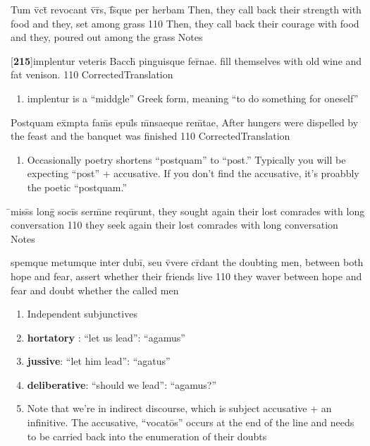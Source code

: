 \latline
  {Tum v\={\macron {\i}}ct\={} revocant v\={\macron {\i}}r\={\macron {\i}}s, f\={}s\={\macron {\i}}que per herbam}
  { Then, they call back their strength with food and they, set among grass }
  {110}
  { Then, they call back their courage with food and they, poured out among the grass }
  { Notes }


\latline
  {[\textbf{215}]implentur veteris Bacch\={\macron {\i}} pinguisque fer\={\macron {\i}}nae.}
  { fill themselves with old wine and fat venison. }
  {110}
  { CorrectedTranslation }
  { \begin{enumerate}
  	\item implentur is a ``middgle'' Greek form, meaning ``to do something for oneself''
  \end{enumerate} }


\latline
  {Postquam ex\={}mpta fam\={}s epul\={\macron {\i}}s m\={}nsaeque rem\={}tae,}
  { After hungers were dispelled by the feast and the banquet was finished }
  {110}
  { CorrectedTranslation }
  { \begin{enumerate}
  	\item Occasionally poetry shortens ``postquam'' to ``post.'' Typically you
    will be expecting ``post'' + accusative. If you don't find the accusative,
    it's proabbly the poetic ``postquam.''
  \end{enumerate} }


\latline
  {\={}miss\={}s long\={} soci\={}s serm\={}ne requ\={\macron {\i}}runt,}
  { they sought again their lost comrades with long conversation }
  {110}
  { they seek again their lost comrades with long conversation }
  { Notes }


\latline
  {spemque metumque inter dubi\={\macron {\i}}, seu v\={\macron {\i}}vere cr\={}dant}
  { the doubting men, between both hope and fear, assert whether their friends live }
  {110}
  { they waver between hope and fear and doubt whether the called men}
  { \begin{enumerate}
  	\item Independent subjunctives
		\item \textbf{hortatory} :  ``let us lead'':  ``agamus''
		\item \textbf{jussive}:  ``let him lead'': ``agatus''
		\item \textbf{deliberative}:  ``should we lead'': ``agamus?''
		\item Note that we're in indirect discourse, which is subject accusative +
    an infinitive. The accusative, ``vocat\={o}s'' occurs at the end of the
    line and needs to be carried back into the enumeration of their doubts
  \end{enumerate} }


